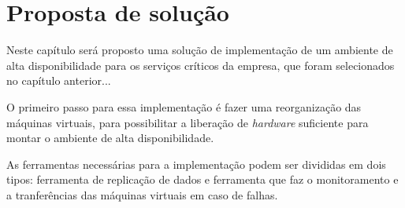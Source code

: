 \chapter{Proposta de solução}
\label{cap:propostadesolucao}

Neste capítulo será proposto uma solução de implementação de um ambiente de alta disponibilidade para os serviços críticos da empresa, que 
foram selecionados no capítulo anterior...

O primeiro passo para essa implementação é fazer uma reorganização das máquinas virtuais, para possibilitar a liberação de \textit{hardware} 
suficiente para montar o ambiente de alta disponibilidade. 

As ferramentas necessárias para a implementação podem ser divididas em dois tipos: ferramenta de replicação de dados e ferramenta que faz o 
monitoramento e a tranferências das máquinas virtuais em caso de falhas.



